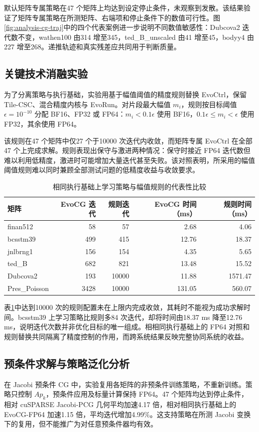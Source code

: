 默认矩阵专属策略在47 个矩阵上均达到设定停止条件，未观察到发散。该结果验证了矩阵专属策略在所测矩阵、右端项和停止条件下的数值可行性。图\ref{fig:analysis-cg-traj}中的四个代表案例进一步说明不同数值敏感性：Dubcova2 迭代数不变，wathen100 由314 增至345，ted\_B\_unscaled 由41 增至45，bodyy4 由227 增至268。递推轨迹和真实残差应共同用于判断质量。

\subsection{关键技术消融实验}
为了分离策略与执行基础，实验用基于幅值阈值的精度规则替换 EvoCtrl，保留 Tile-CSC、混合精度内核与 EvoRun。对片段最大幅值 $m_i$，规则按目标阈值 $\epsilon=10^{-10}$ 分配 BF16、FP32 或 FP64：$m_i<0.1\epsilon$ 使用 BF16，$0.1\epsilon\leq m_i<\epsilon$ 使用 FP32，其余使用 FP64。

该规则在47 个矩阵中仅27 个于10000 次迭代内收敛，而矩阵专属 EvoCtrl 在全部47 个上完成求解。规则表现出保守与激进两种情况：保守时接近 FP64 迭代数但难以利用低精度，激进时可能增加大量迭代甚至失败。该对照表明，所采用的幅值阈值规则难以同时兼顾全部测试问题的低精度收益与收敛要求。

\begin{table}[htbp]\centering
\caption{相同执行基础上学习策略与幅值规则的代表性比较}\label{tab:evo-rule}
\begin{tabular}{lrrrr}\toprule
矩阵&EvoCG 迭代&规则迭代&EvoCG 时间（ms）&规则时间（ms）\\\midrule
finan512&58&57&2.68&4.06\\
bcsstm39&499&415&12.76&18.37\\
jnlbrng1&156&154&4.35&5.65\\
ted\_B&682&821&13.48&15.52\\
Dubcova2&193&10000&11.88&1571.47\\
Pres\_Poisson&3428&10000&131.05&560.07\\\bottomrule
\end{tabular}
\end{table}

表\ref{tab:evo-rule}中达到10000 次的规则配置未在上限内完成收敛，其耗时不能视为成功求解时间。bcsstm39 上学习策略比规则多84 次迭代，却将时间由18.37 ms 降至12.76 ms，说明迭代次数并非优化目标的唯一组成。相相同执行基础上的 FP64 对照和规则替换共同隔离了精度控制的作用，而跨系统结果反映完整协同系统的收益。

\subsection{预条件求解与策略泛化分析}
在 Jacobi 预条件 CG 中，实验复用各矩阵的非预条件训练策略，不重新训练。策略只控制 $Ap_k$，预条件应用及标量计算保持 FP64。47 个矩阵均达到停止条件，相对 cuSPARSE Jacobi-PCG 几何平均加速4.17 倍，相对相同执行基础上的 EvoCG-FP64 加速1.15 倍，平均迭代增加4.99\%。这支持策略在所测 Jacobi 变换下的复用，但不能推广为对任意预条件器均有效。

